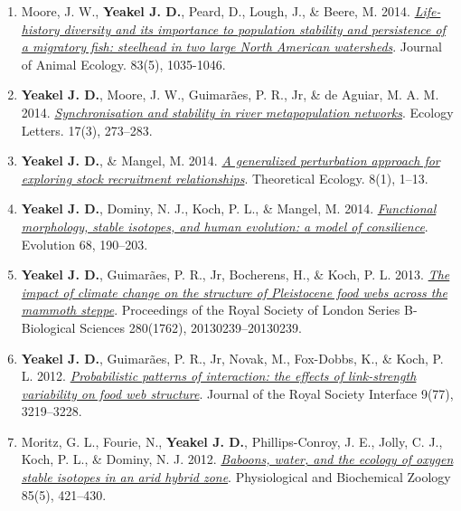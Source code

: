 \documentclass[margin,line,12pt]{res}
\begin{document}
\begin{resume}
\begin{enumerate}
\item Moore, J. W., \textbf{Yeakel J. D.}, Peard, D., Lough, J., \& Beere, M. 2014. \href{https://besjournals.onlinelibrary.wiley.com/doi/10.1111/1365-2656.12212}{\emph{Life-history diversity and its importance to population stability and persistence of a migratory fish: steelhead in two large North American watersheds}}. Journal of Animal Ecology. 83(5), 1035-1046.

\item \textbf{Yeakel J. D.}, Moore, J. W., Guimar\~aes, P. R., Jr, \& de Aguiar, M. A. M. 2014. \href{https://onlinelibrary.wiley.com/doi/abs/10.1111/ele.12228}{\emph{Synchronisation and stability in river metapopulation networks}}. Ecology Letters. 17(3), 273–283.

\item \textbf{Yeakel J. D.}, \& Mangel, M. 2014. \href{https://link.springer.com/article/10.1007/s12080-014-0230-z}{\emph{A generalized perturbation approach for exploring stock recruitment relationships}}. Theoretical Ecology. 8(1), 1–13.

\item \textbf{Yeakel J. D.}, Dominy, N. J., Koch, P. L., \& Mangel, M. 2014. \href{https://onlinelibrary.wiley.com/doi/full/10.1111/evo.12240}{\emph{Functional morphology, stable isotopes, and human evolution: a model of consilience}}. Evolution 68, 190–203.

\item \textbf{Yeakel J. D.}, Guimar\~aes, P. R., Jr, Bocherens, H., \& Koch, P. L. 2013. \href{https://royalsocietypublishing.org/doi/10.1098/rspb.2013.0239}{\emph{The impact of climate change on the structure of Pleistocene food webs across the mammoth steppe}}. Proceedings of the Royal Society of London Series B-Biological Sciences 280(1762), 20130239–20130239.

\item \textbf{Yeakel J. D.}, Guimar\~aes, P. R., Jr, Novak, M., Fox-Dobbs, K., \& Koch, P. L. 2012. \href{https://royalsocietypublishing.org/doi/10.1098/rsif.2012.0481}{\emph{Probabilistic patterns of interaction: the effects of link-strength variability on food web structure}}. Journal of the Royal Society Interface 9(77), 3219–3228.

\item Moritz, G. L., Fourie, N., \textbf{Yeakel J. D.}, Phillips-Conroy, J. E., Jolly, C. J., Koch, P. L., \& Dominy, N. J. 2012. \href{https://pubmed.ncbi.nlm.nih.gov/22902370/}{\emph{Baboons, water, and the ecology of oxygen stable isotopes in an arid hybrid zone}}. Physiological and Biochemical Zoology 85(5), 421–430.


\end{enumerate}
\end{resume}
\end{document}
